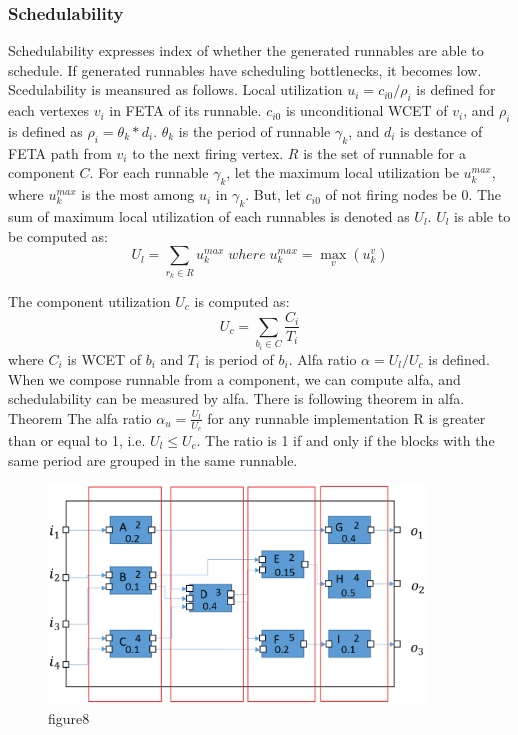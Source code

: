 \documentclass[conference,compsoc]{IEEEtran}
\begin{document}
\subsubsection{Schedulability}
 Schedulability expresses index of whether the generated runnables are able to schedule.
If generated runnables have scheduling bottlenecks, it becomes low.
Scedulability is meansured as follows.
 Local utilization $u_i = c_{i0} / \rho_i$ is defined for each vertexes $v_i$ in  FETA of its runnable.
$c_{i0}$ is unconditional WCET of $v_i$, and $\rho_i$ is defined as $\rho_i = \theta_k * d_i$.
$\theta_k$ is the period of runnable  $\gamma_k$, and $d_i$ is destance of FETA path from $v_i$ to the next firing vertex.
$R$ is the set of runnable for a component $C$.
For each runnable $\gamma_k$, let the maximum local utilization  be $u_{k}^{max}$, where $u_k^{max}$ is the most among $u_i$ in $\gamma_k$.  
But, let $c_{i0}$ of not firing nodes be 0.
The sum of maximum local utilization of each runnables is denoted as $U_l$.
$U_l$ is able to be computed as:
\begin{equation}
 U_l = \sum_{r_k \in R} u_{k}^{max}\;where\;u_{k}^{max} = \max_{v}(u_{k}^{v})
\end{equation}

The component utilization $U_c$ is computed as:
\begin{equation}
U_c = \sum_{b_i \in C} \frac{C_i}{T_i}
\end{equation}
where $C_i$ is WCET of $b_i$ and $T_i$ is period of $b_i$.
 Alfa ratio $\alpha = U_l/U_c$ is defined.
When we compose runnable from a component, we can compute alfa, and schedulability can be measured by alfa.
There is following theorem in alfa.
Theorem The alfa ratio $\alpha_u = \frac{U_l}{U_c}$ for any runnable implementation R is greater than or equal to 1, i.e. $U_l \le U_c$.
The ratio is 1 if and only if the blocks with the same period are grouped in the same runnable.

\begin{figure}
	\centering
	\includegraphics[width=10cm,clip]{figure1.eps}
	\caption{figure8}
	\label{fig8}
\end{figure}
\end{document}

